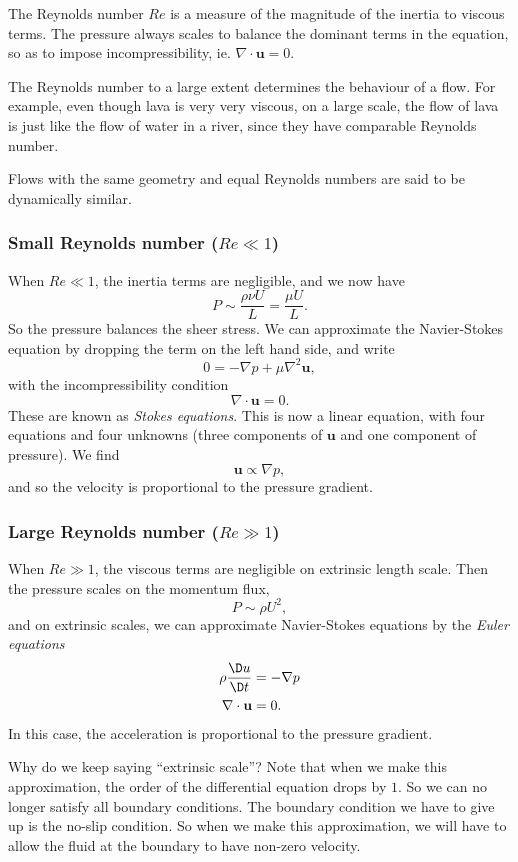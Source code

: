 \documentclass[a4paper]{article}
\begin{document}
The Reynolds number $Re$ is a measure of the magnitude of the inertia to viscous terms. The pressure always scales to balance the dominant terms in the equation, so as to impose incompressibility, ie. $\nabla \cdot \mathbf{u} = 0$.

The Reynolds number to a large extent determines the behaviour of a flow. For example, even though lava is very very viscous, on a large scale, the flow of lava is just like the flow of water in a river, since they have comparable Reynolds number.

\begin{defi}
  Flows with the same geometry and equal Reynolds numbers are said to be dynamically similar.
\end{defi}

\subsubsection{Small Reynolds number (\texorpdfstring{$Re \ll 1$}{Re << 1})}
When $Re \ll 1$, the inertia terms are negligible, and we now have
\[
  P \sim \frac{\rho\nu U}{L} = \frac{\mu U}{L}.
\]
So the pressure balances the sheer stress. We can approximate the Navier-Stokes equation by dropping the term on the left hand side, and write
\[
  0 = -\nabla p + \mu \nabla^2 \mathbf{u},
\]
with the incompressibility condition
\[
  \nabla \cdot \mathbf{u} = 0.
\]
These are known as \emph{Stokes equations}. This is now a linear equation, with four equations and four unknowns (three components of $\mathbf{u}$ and one component of pressure). We find
\[
  \mathbf{u} \propto \nabla p,
\]
and so the velocity is proportional to the pressure gradient.

\subsubsection{Large Reynolds number (\texorpdfstring{$Re \gg 1$}{Re >> 1})}
When $Re \gg 1$, the viscous terms are negligible on extrinsic length scale. Then the pressure scales on the momentum flux,
\[
  P \sim \rho U^2,
\]
and on extrinsic scales, we can approximate Navier-Stokes equations by the \emph{Euler equations}
\begin{align*}
  \rho \frac{\D u}{\D t} &= - \nabla p\\
  \nabla \cdot \mathbf{u} &= 0.
\end{align*}
In this case, the acceleration is proportional to the pressure gradient.

Why do we keep saying ``extrinsic scale''? Note that when we make this approximation, the order of the differential equation drops by $1$. So we can no longer satisfy all boundary conditions. The boundary condition we have to give up is the no-slip condition. So when we make this approximation, we will have to allow the fluid at the boundary to have non-zero velocity.
\end{document}
